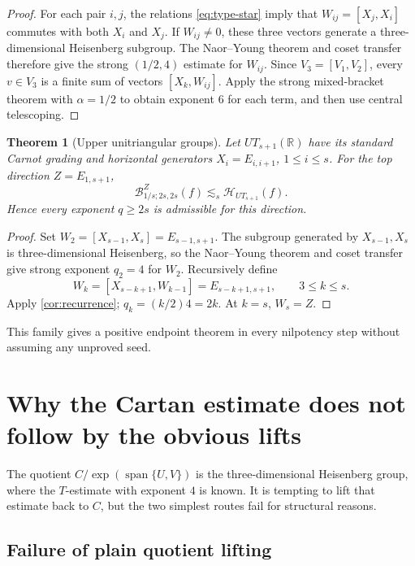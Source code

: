 \documentclass[11pt]{article}
\newtheorem{theorem}{Theorem}[section]
\theoremstyle{definition}
\theoremstyle{remark}
\newcommand{\R}{\mathbb R}
\newcommand{\HH}{\mathcal H}
\newcommand{\B}[4]{\mathcal B^{#1}_{#2;#3,#4}}
\newcommand{\less}{\lesssim}
\DeclareMathOperator{\spanop}{span}
\begin{document}
\begin{proof}
For each pair \(i,j\), the relations \eqref{eq:type-star} imply that
\(W_{ij}=[X_j,X_i]\) commutes with both \(X_i\) and \(X_j\).  If \(W_{ij}\ne0\), these
three vectors generate a three-dimensional Heisenberg subgroup.  The Naor--Young
theorem and coset transfer therefore give the strong \((1/2,4)\) estimate for
\(W_{ij}\).  Since \(V_3=[V_1,V_2]\), every \(v\in V_3\) is a finite sum of vectors
\([X_k,W_{ij}]\).  Apply the strong mixed-bracket theorem with \(\alpha=1/2\) to obtain
exponent \(6\) for each term, and then use central telescoping.
\end{proof}

\begin{theorem}[Upper unitriangular groups]\label{thm:UT}
Let \(UT_{s+1}(\R)\) have its standard Carnot grading and horizontal generators
\(X_i=E_{i,i+1}\), \(1\le i\le s\).  For the top direction
\(Z=E_{1,s+1}\),
\begin{equation}\label{eq:UT}
 \B{Z}{1/s}{2s}{2s}(f)\less_s\HH_{UT_{s+1}}(f).
\end{equation}
Hence every exponent \(q\ge2s\) is admissible for this direction.
\end{theorem}

\begin{proof}
Set \(W_2=[X_{s-1},X_s]=E_{s-1,s+1}\).  The subgroup generated by
\(X_{s-1},X_s\) is three-dimensional Heisenberg, so the Naor--Young theorem and coset
transfer give strong exponent \(q_2=4\) for \(W_2\).  Recursively define
\[
 W_k=[X_{s-k+1},W_{k-1}]=E_{s-k+1,s+1},\qquad 3\le k\le s.
\]
Apply \cref{cor:recurrence}; \(q_k=(k/2)4=2k\).  At \(k=s\), \(W_s=Z\).
\end{proof}

This family gives a positive endpoint theorem in every nilpotency step without assuming
any unproved seed.

\section{Why the Cartan estimate does not follow by the obvious lifts}\label{sec:barrier}

The quotient \(C/\exp(\spanop\{U,V\})\) is the three-dimensional Heisenberg group, where
the \(T\)-estimate with exponent \(4\) is known.  It is tempting to lift that estimate back
to \(C\), but the two simplest routes fail for structural reasons.

\subsection{Failure of plain quotient lifting}
\end{document}
